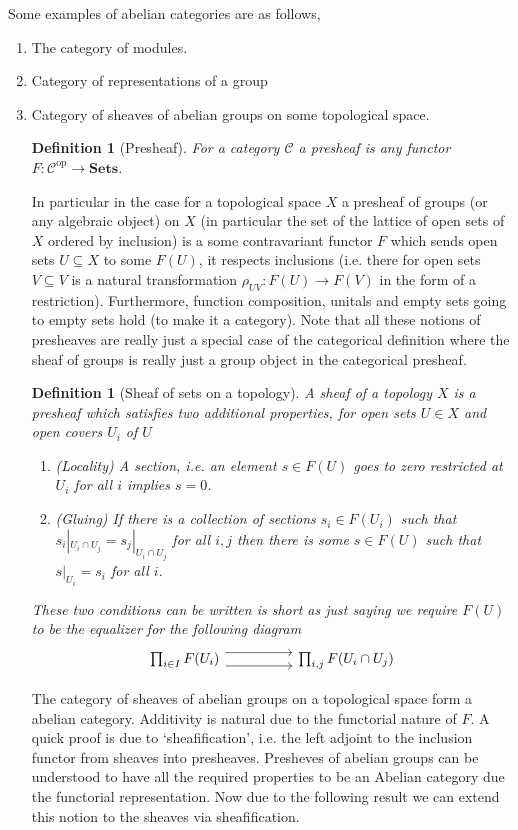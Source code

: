 \documentclass[12pt]{article}
\numberwithin{equation}{section}
\newcounter{dummy} \numberwithin{dummy}{section}
\newtheorem{definition}[dummy]{Definition}
\begin{document}
	Some examples of abelian categories are as follows,
	\begin{enumerate}
		\item The category of modules.
		\item Category of representations of a group
		\item Category of sheaves of abelian groups on some topological space.
		
		\begin{definition}[Presheaf]
			For a category $\mathcal C$ a presheaf is any functor $F: \mathcal{C}^{\mathrm{op}}\to \mathbf{Sets}$.
		\end{definition}
		In particular in the case for a topological space $X$ a presheaf of groups (or any algebraic object) on $X$ (in particular the set of the lattice of open sets of $X$ ordered by inclusion) is a some contravariant functor $F$ which sends open sets $U \subseteq X$ to some $F(U)$, it respects inclusions (i.e. there for open sets $V \subseteq V $ is a natural transformation $\rho_{UV}: F(U)\to F(V)$ in the form of a restriction). Furthermore, function composition, unitals and empty sets going to empty sets hold (to make it a category). Note that all these notions of presheaves are really just a special case of the categorical definition where the sheaf of groups is really just a group object in the categorical presheaf.
		\begin{definition}[Sheaf of sets on a topology]\label{def:scheaf}
			A sheaf of a topology $X$ is a presheaf which satisfies two additional properties, for open sets $U \in X$ and open covers ${U_i}$ of $U$
			\begin{enumerate}
				\item (Locality) A section, i.e. an element $s \in F(U)$ goes to zero restricted at $U_i$ for all $i$ implies $s=0$.
				\item (Gluing) If there is a collection of sections $s_i \in F(U_i)$ such that $s_i|_{U_i \cap U_j}=s_j|_{U_i \cap U_j}$ for all $i,j$ then there is some $s \in F(U)$ such that $s|_{U_i}=s_i$ for all $i$.
			\end{enumerate}
			
			These two conditions can be written is short as just saying we require $F(U)$ to be the equalizer for the following diagram
			\[\begin{tikzcd}
				{\prod_{i \in I} F(U_i)} && {\prod_{i,j}F(U_i \cap U_j)}
				\arrow[shift right=2, from=1-1, to=1-3]
				\arrow[shift left=2, from=1-1, to=1-3]
			\end{tikzcd}\]
		\end{definition}
		
		The category of sheaves of abelian groups on a topological space form a abelian category. Additivity is natural due to the functorial nature of $F$. A quick proof is due to `sheafification', i.e. the left adjoint to the inclusion functor from sheaves into presheaves. Presheves of abelian groups can be understood to have all the required properties to be an Abelian category due the functorial representation. Now due to the following result \cite[Sec. 6.17]{stacks1} we can extend this notion to the sheaves via sheafification.
	\end{enumerate}
	
\end{document}
